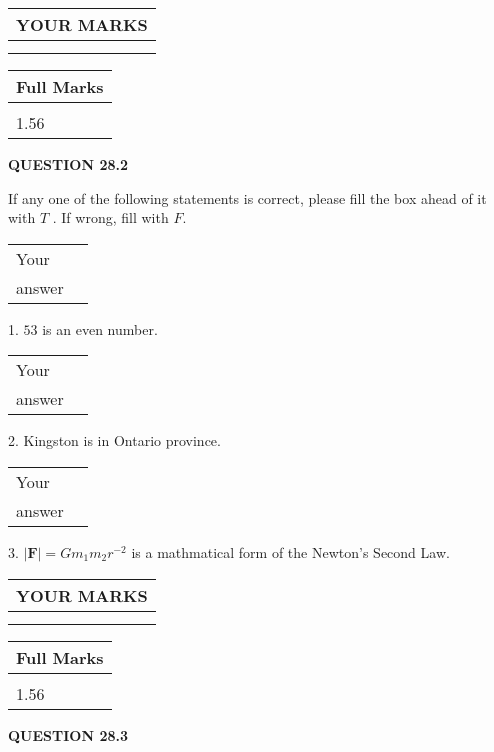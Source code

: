 \documentclass[12pt]{article}
\begin{document}
   
  
\vspace{0.2in}
  
\noindent\begin{tabular}{|l|}
\hline
 YOUR MARKS  \\
\hline
 \\ 
 \\ 
\hline
\end{tabular}
\hspace{0.05in} \begin{tabular}{|l|}
\hline
 Full Marks  \\
\hline
 \\ 
1.56 \\
\hline
\end{tabular}
{\textbf{\Large{QUESTION
28.2 
}}}
  
  
If any one of the following statements is correct, please fill the box ahead of it with $T$ .
If wrong, fill with $F$.
 
\noindent\begin{tabular}{|l|l|}\hline Your&\hspace{.2in} \\ answer&\hspace{.2in} \\ \hline \end{tabular}
1. $ %
53$ is an  %
even number.
 
\noindent\begin{tabular}{|l|l|}\hline Your&\hspace{.2in} \\ answer&\hspace{.2in} \\ \hline \end{tabular}
2.  %
Kingston is in  %
Ontario province.
 
\noindent\begin{tabular}{|l|l|}\hline Your&\hspace{.2in} \\ answer&\hspace{.2in} \\ \hline \end{tabular}
3.  %
$\left| \mathbf{F}\right| =Gm_1m_2r^{-2}$ is a mathmatical form of
the Newton's Second Law.
 

 
\vspace{0.3in}
  
\vspace{0.2in}
  
\noindent\begin{tabular}{|l|}
\hline
 YOUR MARKS  \\
\hline
 \\ 
 \\ 
\hline
\end{tabular}
\hspace{0.05in} \begin{tabular}{|l|}
\hline
 Full Marks  \\
\hline
 \\ 
1.56 \\
\hline
\end{tabular}
{\textbf{\Large{QUESTION
28.3 
}}}
  
\end{document}
